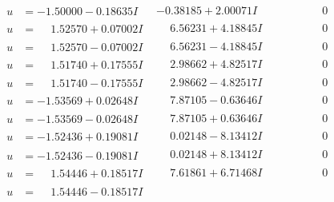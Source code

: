 \documentclass[1p]{elsarticle_modified}
\theoremstyle{definition}
\begin{document}
$$\begin{array}{c|c|c}
 \hline 
\begin{aligned}
u &= -1.50000 - 0.18635 I\end{aligned}
 & -0.38185 + 2.00071 I & \phantom{-0.000000 } 0 \\ \hline\begin{aligned}
u &= \phantom{-}1.52570 + 0.07002 I\end{aligned}
 & \phantom{-}6.56231 + 4.18845 I & \phantom{-0.000000 } 0 \\ \hline\begin{aligned}
u &= \phantom{-}1.52570 - 0.07002 I\end{aligned}
 & \phantom{-}6.56231 - 4.18845 I & \phantom{-0.000000 } 0 \\ \hline\begin{aligned}
u &= \phantom{-}1.51740 + 0.17555 I\end{aligned}
 & \phantom{-}2.98662 + 4.82517 I & \phantom{-0.000000 } 0 \\ \hline\begin{aligned}
u &= \phantom{-}1.51740 - 0.17555 I\end{aligned}
 & \phantom{-}2.98662 - 4.82517 I & \phantom{-0.000000 } 0 \\ \hline\begin{aligned}
u &= -1.53569 + 0.02648 I\end{aligned}
 & \phantom{-}7.87105 - 0.63646 I & \phantom{-0.000000 } 0 \\ \hline\begin{aligned}
u &= -1.53569 - 0.02648 I\end{aligned}
 & \phantom{-}7.87105 + 0.63646 I & \phantom{-0.000000 } 0 \\ \hline\begin{aligned}
u &= -1.52436 + 0.19081 I\end{aligned}
 & \phantom{-}0.02148 - 8.13412 I & \phantom{-0.000000 } 0 \\ \hline\begin{aligned}
u &= -1.52436 - 0.19081 I\end{aligned}
 & \phantom{-}0.02148 + 8.13412 I & \phantom{-0.000000 } 0 \\ \hline\begin{aligned}
u &= \phantom{-}1.54446 + 0.18517 I\end{aligned}
 & \phantom{-}7.61861 + 6.71468 I & \phantom{-0.000000 } 0 \\ \hline\begin{aligned}
u &= \phantom{-}1.54446 - 0.18517 I\end{aligned}

\end{array}$$
\end{document}
